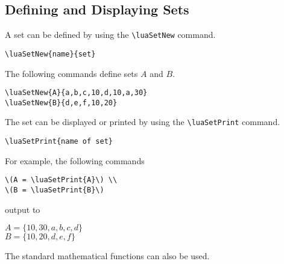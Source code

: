 \documentclass{article}
\begin{document}
\subsection{Defining and Displaying Sets}
A set can be defined by using the \verb|\luaSetNew| command.
\begin{lstlisting}
\luaSetNew{name}{set}
\end{lstlisting}
The following commands define sets \( A \) and \(B \).
\begin{lstlisting}
\luaSetNew{A}{a,b,c,10,d,10,a,30}
\luaSetNew{B}{d,e,f,10,20}
\end{lstlisting}
The set can be displayed or printed by using the \verb|\luaSetPrint| command.
\begin{lstlisting}
\luaSetPrint{name of set}
\end{lstlisting}
 For example, the following commands
 \begin{lstlisting}
\(A = \luaSetPrint{A}\) \\
\(B = \luaSetPrint{B}\)
\end{lstlisting}
output to
\begin{framed}
\noindent \(A = \{10, 30, a, b, c, d\}\) \\
\(B = \{10, 20, d, e, f\}\)
\end{framed}
The standard mathematical functions can also be used. 
\end{document}
